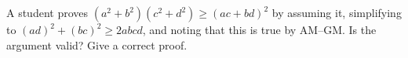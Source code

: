 A student proves $(a^2+b^2)(c^2+d^2)\ge(ac+bd)^2$ by assuming it, simplifying to $(ad)^2+(bc)^2\ge2abcd$, and noting that this is true by AM--GM. Is the argument valid? Give a correct proof.
